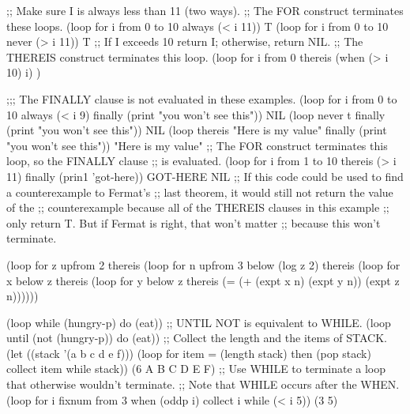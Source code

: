 
\code ;; Make sure I is always less than 11 (two ways). ;; The FOR construct terminates these loops.
 (loop for i from 0 to 10
       always (< i 11)) \EV T
 (loop for i from 0 to 10
       never (> i 11)) \EV T
  ;; If I exceeds 10 return I; otherwise, return NIL. ;; The THEREIS construct terminates this loop.
 (loop for i from 0
       thereis (when (> i 10) i) ) 

;;; The FINALLY clause is not evaluated in these examples.
 (loop for i from 0 to 10
       always (< i 9)
       finally (print "you won't see this")) \EV NIL
 (loop never t
       finally (print "you won't see this")) \EV NIL
 (loop thereis "Here is my value"
       finally (print "you won't see this")) \EV "Here is my value"
  ;; The FOR construct terminates this loop, so the FINALLY clause  ;; is evaluated.
 (loop for i from 1 to 10
       thereis (> i 11)
       finally (prin1 'got-here)) \OUT GOT-HERE \EV NIL
  ;; If this code could be used to find a counterexample to Fermat's ;; last theorem, it would still not return the value of the ;; counterexample because all of the THEREIS clauses in this example ;; only return T.  But if Fermat is right, that won't matter ;; because this won't terminate.
 
 (loop for z upfrom 2
       thereis
         (loop for n upfrom 3 below (log z 2)
               thereis
                 (loop for x below z
                       thereis
                         (loop for y below z
                               thereis (= (+ (expt x n) (expt y n))
                                          (expt z n)))))) \endcode

\endsubsubsection%


\code
 (loop while (hungry-p) do (eat))
  ;; UNTIL NOT is equivalent to WHILE.
 (loop until (not (hungry-p)) do (eat))
  ;; Collect the length and the items of STACK.
 (let ((stack '(a b c d e f)))
   (loop for item = (length stack) then (pop stack)
         collect item
         while stack)) \EV (6 A B C D E F)
  ;; Use WHILE to terminate a loop that otherwise wouldn't terminate. ;; Note that WHILE occurs after the WHEN.
 (loop for i fixnum from 3
       when (oddp i) collect i
       while (< i 5)) \EV (3 5) \endcode

\endsubsubsection%


